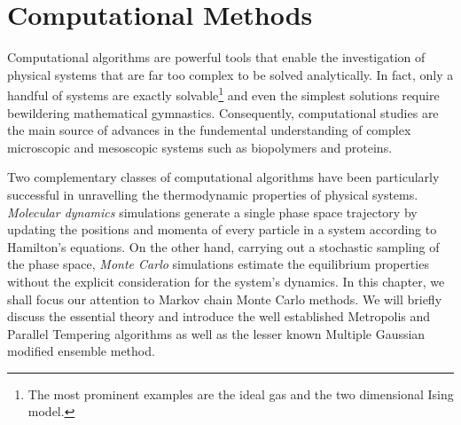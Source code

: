 \documentclass[12pt]{report}
\begin{document}

\chapter{Computational Methods}

Computational algorithms are powerful tools that enable the investigation of physical systems that are far too complex to be solved analytically.
In fact, only a handful of systems are exactly solvable\footnote{The most prominent examples are the ideal gas and the two dimensional Ising model.} and even the simplest solutions require bewildering mathematical gymnastics. Consequently, computational studies are the main source of advances in the fundemental understanding of complex microscopic and mesoscopic systems such as biopolymers and proteins.

Two complementary classes of computational algorithms have been particularly successful in unravelling the thermodynamic properties of physical systems. \textit{Molecular dynamics} simulations generate a single phase space trajectory by updating the positions and momenta of every particle in a system according to Hamilton's equations. On the other hand, carrying out a stochastic sampling of the phase space, \textit{Monte Carlo} simulations estimate the equilibrium properties without the explicit consideration for the system's dynamics. In this chapter, we shall focus our attention to Markov chain Monte Carlo methods. We will briefly discuss the essential theory and introduce the well established Metropolis and Parallel Tempering algorithms as well as the lesser known Multiple Gaussian modified ensemble method.
\end{document}
